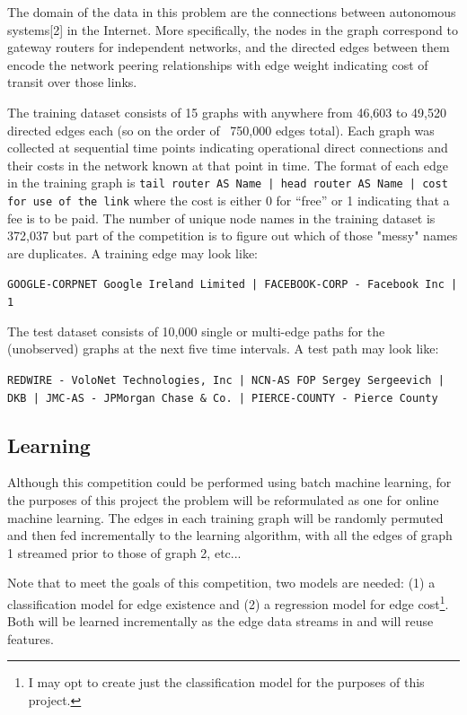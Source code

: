 \documentclass{article} %
\begin{document}
The domain of the data in this problem are the connections between
autonomous systems[2] in the Internet.  More specifically, the nodes in the
graph correspond to gateway routers for independent networks, and the directed
edges between them encode the network peering relationships with edge weight indicating cost of
transit over those links.

The training dataset consists of 15 graphs with anywhere from 46,603 to 49,520 directed edges each (so on the
order of ~750,000 edges total).  Each graph was collected at sequential time
points indicating operational direct connections and their costs in the
network known at that point in time.  The format of each edge in the
training graph is \texttt{tail router AS Name | head router AS
  Name | cost for use of the link} where the cost is either 0 for ``free'' or 1
indicating that a fee is to be paid.  The number of unique node names in the
training dataset is 372,037 but part of the competition is to figure out
which of those "messy" names are duplicates.  A training edge may look like:

\texttt{{\small GOOGLE-CORPNET Google Ireland Limited | FACEBOOK-CORP - Facebook Inc | 1}}

The test dataset consists of 10,000 single or multi-edge paths for the (unobserved)
graphs at the next five time intervals.  A test path may look like:

\texttt{{\small REDWIRE - VoloNet Technologies, Inc | NCN-AS FOP Sergey Sergeevich | DKB | JMC-AS - JPMorgan Chase \& Co. | PIERCE-COUNTY - Pierce County}}

\subsection{Learning}

Although this competition could be performed using batch machine learning,
for the purposes of this project the problem will be reformulated as one for
online machine learning.  The edges in each training graph will be randomly
permuted and then fed incrementally to the learning algorithm, with all the
edges of graph 1 streamed prior to those of graph 2, etc...

Note that to meet the goals of this competition, two models are needed: (1)
a classification model for edge existence and (2) a regression model for
edge cost\footnote{I may opt to create just the classification model for the
  purposes of this project.}.  Both will be learned incrementally as the edge data streams in
and will reuse features.
\end{document}
